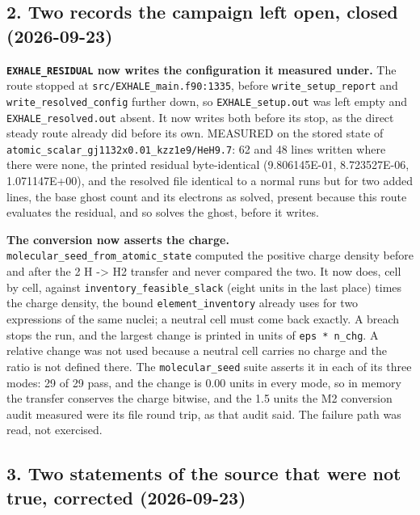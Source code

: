 \documentclass[english,a4paper]{my_memo}
\begin{document}
\subsection{2. Two records the campaign left open, closed (2026-09-23)}\label{2-two-records-the-campaign-left-open-closed-2026-09-23}

\textbf{\texttt{EXHALE\_RESIDUAL} now writes the configuration it measured under.} The
route stopped at \texttt{src/EXHALE\_main.f90:1335}, before \texttt{write\_setup\_report} and
\texttt{write\_resolved\_config} further down, so \texttt{EXHALE\_setup.out} was left empty and
\texttt{EXHALE\_resolved.out} absent. It now writes both before its stop, as the direct
steady route already did before its own. MEASURED on the stored state of
\texttt{atomic\_scalar\_gj1132x0.01\_kzz1e9/HeH9.7}: 62 and 48 lines written where there
were none, the printed residual byte-identical (9.806145E-01, 8.723527E-06,
1.071147E+00), and the resolved file identical to a normal run\textquotesingle s but for two
added lines, the base ghost count and its electrons as solved, present because
this route evaluates the residual, and so solves the ghost, before it writes.

\textbf{The conversion now asserts the charge.} \texttt{molecular\_seed\_from\_atomic\_state}
computed the positive charge density before and after the 2 H -\textgreater{} H2 transfer
and never compared the two. It now does, cell by cell, against
\texttt{inventory\_feasible\_slack} (eight units in the last place) times the charge
density, the bound \texttt{element\_inventory} already uses for two expressions of the
same nuclei; a neutral cell must come back exactly. A breach stops the run, and
the largest change is printed in units of \texttt{eps\ *\ n\_chg}. A relative change was
not used because a neutral cell carries no charge and the ratio is not defined
there. The \texttt{molecular\_seed} suite asserts it in each of its three modes:
29 of 29 pass, and the change is 0.00 units in every mode, so in memory the
transfer conserves the charge bitwise, and the 1.5 units the M2 conversion
audit measured were its file round trip, as that audit said. The failure path
was read, not exercised.

\subsection{3. Two statements of the source that were not true, corrected (2026-09-23)}\label{3-two-statements-of-the-source-that-were-not-true-corrected-2026-09-23}
\end{document}
